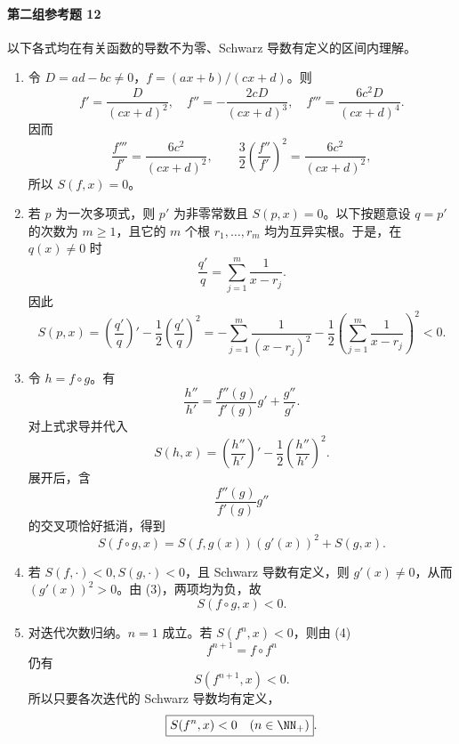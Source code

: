 \paragraph{第二组参考题 12}
\begin{xsolution}
以下各式均在有关函数的导数不为零、Schwarz 导数有定义的区间内理解。
\begin{enumerate}[label=(\arabic*)]
  \item 令 $D=ad-bc\ne0$，$f=(ax+b)/(cx+d)$。则
  \[
    f'=\frac{D}{(cx+d)^2},\quad
    f''=-\frac{2cD}{(cx+d)^3},\quad
    f'''=\frac{6c^2D}{(cx+d)^4}.
  \]
  因而
  \[
    \frac{f'''}{f'}=\frac{6c^2}{(cx+d)^2},
    \qquad
    \frac32\left(\frac{f''}{f'}\right)^2
    =\frac{6c^2}{(cx+d)^2},
  \]
  所以 $\boxed{S(f,x)=0}$。

  \item 若 $p$ 为一次多项式，则 $p'$ 为非零常数且 $S(p,x)=0$。以下按题意设 $q=p'$ 的次数为 $m\ge1$，且它的 $m$ 个根 $r_1,\ldots,r_m$ 均为互异实根。于是，在 $q(x)\ne0$ 时
  \[
    \frac{q'}q=\sum_{j=1}^m\frac1{x-r_j}.
  \]
  因此
  \[
    S(p,x)=\left(\frac{q'}q\right)'-\frac12\left(\frac{q'}q\right)^2
    =-\sum_{j=1}^m\frac1{(x-r_j)^2}
     -\frac12\left(\sum_{j=1}^m\frac1{x-r_j}\right)^2<0.
  \]

  \item 令 $h=f\circ g$。有
  \[
    \frac{h''}{h'}
    =\frac{f''(g)}{f'(g)}g'+\frac{g''}{g'}.
  \]
  对上式求导并代入
  \[
    S(h,x)=\left(\frac{h''}{h'}\right)'-\frac12\left(\frac{h''}{h'}\right)^2.
  \]
  展开后，含
  \[
    \frac{f''(g)}{f'(g)}g''
  \]
  的交叉项恰好抵消，得到
  \[
    \boxed{S(f\circ g,x)=S(f,g(x))(g'(x))^2+S(g,x)}.
  \]

  \item 若 $S(f,\cdot)<0,S(g,\cdot)<0$，且 Schwarz 导数有定义，则 $g'(x)\ne0$，从而 $(g'(x))^2>0$。由 (3)，两项均为负，故
  \[
    \boxed{S(f\circ g,x)<0}.
  \]

  \item 对迭代次数归纳。$n=1$ 成立。若 $S(f^n,x)<0$，则由 (4)
  \[
    f^{n+1}=f\circ f^n
  \]
  仍有
  \[
    S(f^{n+1},x)<0.
  \]
  所以只要各次迭代的 Schwarz 导数均有定义，
  \[
    \boxed{S(f^n,x)<0\quad(n\in\NN_+)}.
  \]
\end{enumerate}
\end{xsolution}

